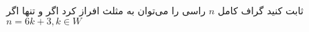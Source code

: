 \begin{PROBLEM}
	\p
	ثابت کنید گراف کامل 
	$n$
	راسی را می‌توان به مثلث افراز کرد اگر و تنها اگر 
	$n = 6k + 3, k \in W$
	\SOLUTION{
		\p
		
	}
\end{PROBLEM}